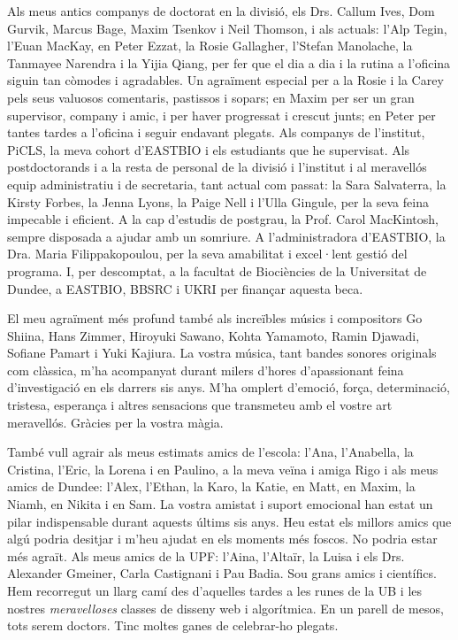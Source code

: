 Als meus antics companys de doctorat en la divisió, els Drs. Callum Ives, Dom Gurvik, Marcus Bage, Maxim Tsenkov i Neil Thomson, i als actuals: l'Alp Tegin, l'Euan MacKay, en Peter Ezzat, la Rosie Gallagher, l'Stefan Manolache, la Tanmayee Narendra i la Yijia Qiang, per fer que el dia a dia i la rutina a l'oficina siguin tan còmodes i agradables. Un agraïment especial per a la Rosie i la Carey pels seus valuosos comentaris, pastissos i sopars; en Maxim per ser un gran supervisor, company i amic, i per haver progressat i crescut junts; en Peter per tantes tardes a l'oficina i seguir endavant plegats. Als companys de l'institut, PiCLS, la meva cohort d'EASTBIO i els estudiants que he supervisat. Als postdoctorands i a la resta de personal de la divisió i l'institut i al meravellós equip administratiu i de secretaria, tant actual com passat: la Sara Salvaterra, la Kirsty Forbes, la Jenna Lyons, la Paige Nell i l'Ulla Gingule, per la seva feina impecable i eficient. A la cap d'estudis de postgrau, la Prof. Carol MacKintosh, sempre disposada a ajudar amb un somriure. A l'administradora d'EASTBIO, la Dra. Maria Filippakopoulou, per la seva amabilitat i excel·lent gestió del programa. I, per descomptat, a la facultat de Biociències de la Universitat de Dundee, a EASTBIO, BBSRC i UKRI per finançar aquesta beca.

El meu agraïment més profund també als increïbles músics i compositors Go Shiina, Hans Zimmer, Hiroyuki Sawano, Kohta Yamamoto, Ramin Djawadi, Sofiane Pamart i Yuki Kajiura. La vostra música, tant bandes sonores originals com clàssica, m'ha acompanyat durant milers d'hores d'apassionant feina d'investigació en els darrers sis anys. M'ha omplert d'emoció, força, determinació, tristesa, esperança i altres sensacions que transmeteu amb el vostre art meravellós. Gràcies per la vostra màgia.

També vull agrair als meus estimats amics de l'escola: l'Ana, l'Anabella, la Cristina, l'Eric, la Lorena i en Paulino, a la meva veïna i amiga Rigo i als meus amics de Dundee: l'Alex, l'Ethan, la Karo, la Katie, en Matt, en Maxim, la Niamh, en Nikita i en Sam. La vostra amistat i suport emocional han estat un pilar indispensable durant aquests últims sis anys. Heu estat els millors amics que algú podria desitjar i m'heu ajudat en els moments més foscos. No podria estar més agraït. Als meus amics de la UPF: l'Aina, l'Altaïr, la Luisa i els Drs. Alexander Gmeiner, Carla Castignani i Pau Badia. Sou grans amics i científics. Hem recorregut un llarg camí des d'aquelles tardes a les runes de la UB i les nostres \textit{meravelloses} classes de disseny web i algorítmica. En un parell de mesos, tots serem doctors. Tinc moltes ganes de celebrar-ho plegats.

